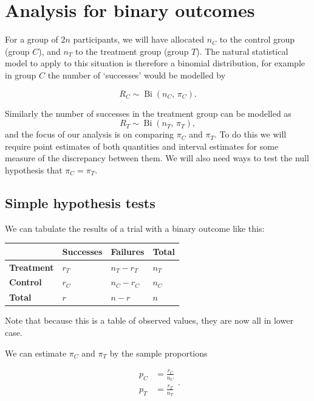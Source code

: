 \documentclass[
  openany]{book}
\theoremstyle{definition}
\theoremstyle{definition}
\theoremstyle{definition}
\theoremstyle{definition}
\theoremstyle{remark}
\begin{document}
\chapter{Analysis for binary outcomes}\label{binary-analysis}

For a group of \(2n\) participants, we will have allocated \(n_C\) to the control group (group \(C\)), and \(n_T\) to the treatment group (group \(T\)). The natural statistical model to apply to this situation is therefore a binomial distribution, for example in group \(C\) the number of `successes' would be modelled by

\[R_C \sim \operatorname{Bi}\left(n_C,\,\pi_C\right).\]

Similarly the number of successes in the treatment group can be modelled as
\[R_T \sim\operatorname{Bi}\left(n_T,\,\pi_T\right),\]
and the focus of our analysis is on comparing \(\pi_C\) and \(\pi_T\). To do this we will require point estimates of both quantities and interval estimates for some measure of the discrepancy between them. We will also need ways to test the null hypothesis that \(\pi_C = \pi_T.\)

\section{Simple hypothesis tests}\label{bin-point-est}

We can tabulate the results of a trial with a binary outcome like this:

\begin{longtable}[]{@{}llll@{}}
\toprule\noalign{}
& Successes & Failures & Total \\
\midrule\noalign{}
\endhead
\bottomrule\noalign{}
\endlastfoot
\textbf{Treatment} & \(r_T\) & \(n_T-r_T\) & \(n_T\) \\
\textbf{Control} & \(r_C\) & \(n_C-r_C\) & \(n_C\) \\
\textbf{Total} & \(r\) & \(n - r\) & \(n\) \\
\end{longtable}

Note that because this is a table of observed values, they are now all in lower case.

We can estimate \(\pi_C\) and \(\pi_T\) by the sample proportions

\[
\begin{aligned}
p_C &= \frac{r_C}{n_C}\\
p_T &= \frac{r_T}{n_T}
\end{aligned}.
\]
\end{document}

